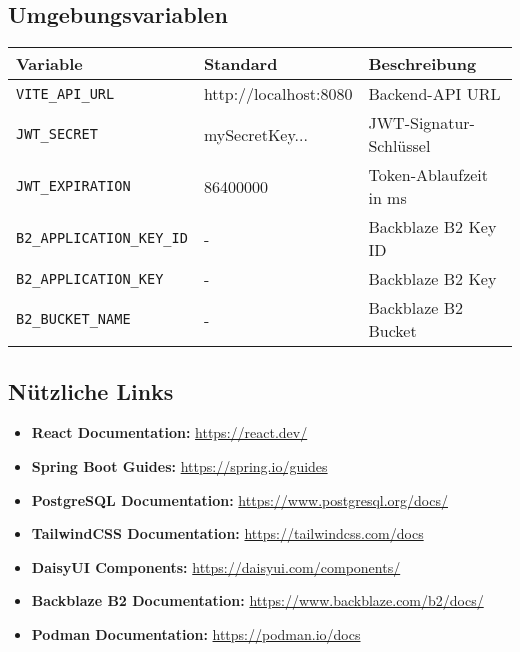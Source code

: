 \documentclass[a4paper,12pt]{article}
\begin{document}
\subsection{Umgebungsvariablen}
\begin{longtable}{|p{}|p{}|p{}|}
\hline
\textbf{Variable} & \textbf{Standard} & \textbf{Beschreibung} \\
\hline
\texttt{VITE\_API\_URL} & http://localhost:8080 & Backend-API URL \\
\hline
\texttt{JWT\_SECRET} & mySecretKey... & JWT-Signatur-Schlüssel \\
\hline
\texttt{JWT\_EXPIRATION} & 86400000 & Token-Ablaufzeit in ms \\
\hline
\texttt{B2\_APPLICATION\_KEY\_ID} & - & Backblaze B2 Key ID \\
\hline
\texttt{B2\_APPLICATION\_KEY} & - & Backblaze B2 Key \\
\hline
\texttt{B2\_BUCKET\_NAME} & - & Backblaze B2 Bucket \\
\hline
\end{longtable}

\subsection{Nützliche Links}
\begin{itemize}
    \item \textbf{React Documentation:} \url{https://react.dev/}
    \item \textbf{Spring Boot Guides:} \url{https://spring.io/guides}
    \item \textbf{PostgreSQL Documentation:} \url{https://www.postgresql.org/docs/}
    \item \textbf{TailwindCSS Documentation:} \url{https://tailwindcss.com/docs}
    \item \textbf{DaisyUI Components:} \url{https://daisyui.com/components/}
    \item \textbf{Backblaze B2 Documentation:} \url{https://www.backblaze.com/b2/docs/}
    \item \textbf{Podman Documentation:} \url{https://podman.io/docs}
\end{itemize}
\end{document}
